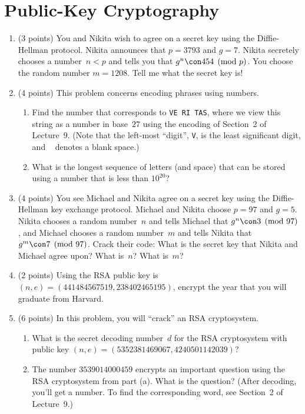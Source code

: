 \documentclass[11pt]{report}
\begin{document}
\section{Public-Key Cryptography}
\begin{enumerate}
  \item (3 points) You and Nikita wish to agree on a secret key using
        the Diffie-Hellman protocol.  Nikita announces that $p=3793$ and
        $g=7$.  Nikita secretely chooses a number~$n<p$ and tells you
        that $g^n\con 454\pmod{p}$.  You choose the random number
        $m=1208$.  Tell me what the secret key is!

  \item (4 points) This problem concerns encoding phrases using numbers.
        \begin{enumerate}
          \item Find the number that corresponds to
                \verb*|VE RI TAS|, where we view this string as a number in
                base~$27$ using the encoding of Section~2 of Lecture~9.
                (Note that the left-most ``digit'', \verb*|V|, is the
                least significant digit, and \verb*| | denotes a blank space.)
          \item What is the longest sequence of letters (and space) that
                can be stored using a number that is less than $10^{20}$?
        \end{enumerate}

  \item (4 points) You see Michael and
        Nikita agree on a secret key using the Diffie-Hellman key exchange
        protocol.  Michael and Nikita choose $p=97$ and $g=5$.  Nikita chooses
        a random number~$n$ and tells Michael that $g^n\con 3\pmod{97}$, and
        Michael chooses a random number~$m$ and tells Nikita that $g^m\con
          7\pmod{97}$.  Crack their code: What is the secret key that Nikita and
        Michael agree upon?  What is~$n$?  What is~$m$?

  \item (2 points)
        Using the RSA public key is $(n,e) = (441484567519, 238402465195)$,
        encrypt the year that you will graduate from Harvard.

  \item (6 points) In this problem, you will ``crack'' an RSA cryptosystem.
        \begin{enumerate}
          \item What is the secret decoding number~$d$ for the RSA
                cryptosystem with public key $(n,e) = (5352381469067, 4240501142039)$?
          \item The number $3539014000459$ encrypts an important question using
                the RSA cryptosystem from part (a).  What is the question?  (After decoding,
                you'll get a number.  To find the corresponding word, see Section~2 of
                Lecture~9.)
        \end{enumerate}


\end{enumerate}
\end{document}
